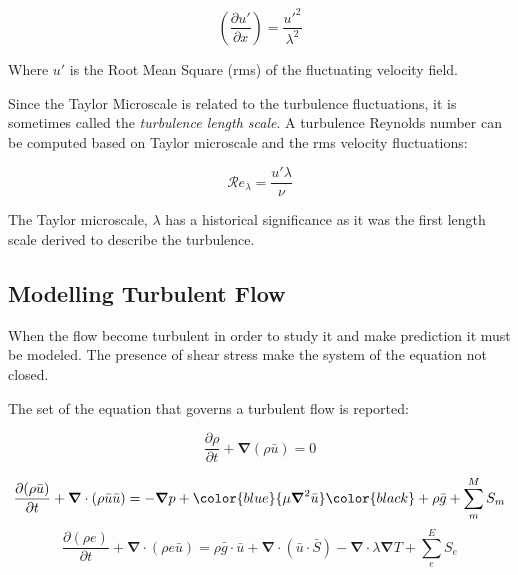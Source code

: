 \begin{equation}
\left( \frac{\partial u'}{\partial x} \right) = \frac{u'^2}{\lambda^2}
\label{eq:tay1}
\end{equation}

Where $u'$ is the Root Mean Square (rms) of the fluctuating velocity field.

Since the Taylor Microscale is related to the turbulence fluctuations, it is sometimes called the \textit{turbulence length scale}.
A turbulence Reynolds number can be computed based on Taylor microscale and the rms velocity fluctuations:

\begin{equation}
\mathcal{R}e_\lambda = \frac{u' \lambda}{\nu} 
\end{equation}

The Taylor microscale, $\lambda $ has a historical significance as it was the first length scale derived to describe the turbulence.

\subsection{Modelling Turbulent Flow}

When the flow become turbulent in order to study it and make prediction it must be modeled. The presence of shear stress make the system of the equation not closed.

The set of the equation that governs a turbulent flow is reported:

\begin{equation}
\frac{\partial \rho}{\partial t} + \boldsymbol{\nabla} (\rho \bar{u}) = 0
\label{eq:continuity}
\end{equation}

\begin{equation}
\frac{\partial (\rho \bar{u})}{\partial t} + \boldsymbol{\nabla} \cdot (\rho\bar{u}\bar{u}) = -\boldsymbol{\nabla}p + \color{blue}{\mu \boldsymbol{\nabla}^2 \bar{u}} \color{black} + \rho \bar{g} + \sum_m^M S_{m}
\label{eq:momentum}
\end{equation}
\begin{equation}
\frac{\partial (\rho e )}{\partial t} + \boldsymbol{\nabla} \cdot (\rho e \bar{u} ) = \rho \bar{g} \cdot \bar{u} + \boldsymbol{\nabla} \cdot (\bar{u} \cdot \bar{S}) - \boldsymbol{\nabla} \cdot \lambda \boldsymbol{\nabla} T + \sum_{e}^E S_e
\label{eq:energy}
\end{equation}

